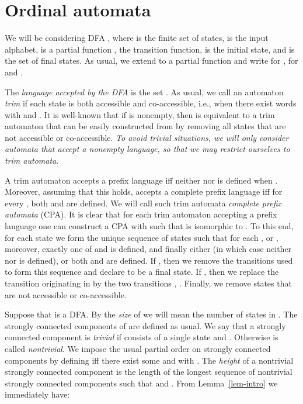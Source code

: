 \documentclass[copyright]{eptcs}
\begin{document}
 










\section{Ordinal automata}

We will be considering DFA ,
where  is the finite set of states,  is the
input alphabet,  is a partial function
, the transition function,
 is the initial state, and  
is the set of final states. As usual, we extend  
to a partial function  
and write  for , for  and
.


The \emph{language  accepted by the DFA} 
 is the set . 
As usual, we call an automaton  \emph{trim}
if each state  is both accessible and
co-accessible, i.e., when there exist words  with  and . It is well-known that 
if  is nonempty, then  is equivalent to a 
trim automaton that can be easily constructed from  
by removing all states that are not accessible or co-accessible.
\emph{To avoid trivial situations, we will only consider 
automata that accept a nonempty language, so that we 
may restrict ourselves to trim automata}.

A trim automaton 
accepts a prefix language iff neither  nor  is defined 
when .  Moreover, assuming that 
this holds,  accepts a complete prefix language iff
for every , both  
and  are defined. We will call such trim 
automata \emph{complete prefix automata} (CPA). It is clear that 
for each trim automaton  accepting a prefix language 
one can construct a CPA  
with   such that  is isomorphic to 
. To this end, for each state  we 
form the unique sequence of states  
such that for each ,  or , 
moreover, exactly one of  and  is defined, and finally
either  (in which case neither  nor  is defined), 
or both  and  are defined. If , then we remove 
the transitions used to form this sequence and declare  to be a final state. 
If , then we replace the transition originating in 
by the two transitions , .
Finally, we remove states that are not accessible or co-accessible. 
 

Suppose that   is a DFA. By the \emph{size} of  
we will mean the number of states in . 
The strongly connected components of  
are defined as usual. We say that a strongly connected component  is \emph{trivial} 
if  consists of a single state  and .
Otherwise  is called \emph{nontrivial}. 
We impose  the usual  
partial order on strongly connected components by defining  iff 
there exist some  and  with . The \emph{height}
of a nontrivial strongly connected component  is the length  of the 
longest sequence  of nontrivial strongly connected 
components such that  and . 
From Lemma~\ref{lem-intro} we immediately have:
\end{document}

